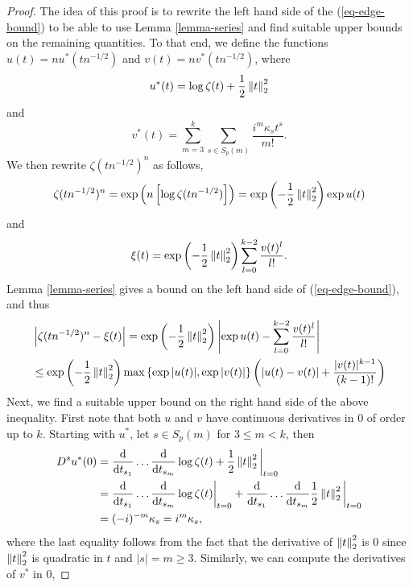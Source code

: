 \begin{proof}
    The idea of this proof is to rewrite the left hand side of the (\ref{eq-edge-bound}) to be able to use Lemma \ref{lemma-series} and find suitable upper bounds on the remaining quantities. To that end, we define the functions $u(t) = n u^*(t n^{-1/2})$ and $v(t) = nv^*(t n^{-1/2})$, where
    \begin{equation*}
        u^*(t) = \log \zeta(t) + \frac{1}{2}\left\lVert t\right\rVert_2^2
    \end{equation*}
    and 
    \begin{equation*}
        v^*(t) = \sum_{m=3}^k \sum_{s \in S_p(m)} \frac{i^m\kappa_s t^s}{m!}.
    \end{equation*}
    We then rewrite $\zeta(t n^{-1/2})^n$ as follows,
    \begin{equation*}
        \zeta(t n^{-1/2})^n = \exp\left(n\left[\log \zeta(t n^{-1/2})\right]\right) = \exp\left(-\frac{1}{2}\left\lVert t\right\rVert_2^2\right)\exp u(t)
    \end{equation*}
    and
    \begin{equation*}
        \xi(t) = \exp\left(-\frac{1}{2}\left\lVert t\right\rVert_2^2\right)\sum_{l=0}^{k-2} \frac{v(t)^l}{l!}.
    \end{equation*}
    Lemma \ref{lemma-series} gives a bound on the left hand side of (\ref{eq-edge-bound}), and thus
    \begin{align*}
        &\left|\zeta(t n^{-1/2})^n - \xi(t)\right| 
        = \exp\left(-\frac{1}{2}\left\lVert t\right\rVert_2^2\right)\left|\exp u(t) - \sum_{l=0}^{k-2} \frac{v(t)^l}{l!}\right|\\
        &\leq \exp\left(-\frac{1}{2}\left\lVert t\right\rVert_2^2\right) \max \left\{ \exp{|u(t)|}, \exp{|v(t)|} \right\}\left(\left|u(t) - v(t)\right| + \frac{|v(t)|^{k-1}}{(k-1)!}\right)
    \end{align*}
    Next, we find a suitable upper bound on the right hand side of the above inequality. First note that both $u$ and $v$ have continuous derivatives in 0 of order up to $k$. Starting with $u^*$, let $s \in S_p(m)$ for $3 \leq m < k$, then
    \begin{align*}
        D^s u^*(0)
        &= \frac{\text{d}}{\text{d} t_{s_1}}\ldots\frac{\text{d}}{\text{d} t_{s_m}} \log \zeta(t) + \frac{1}{2}\left\lVert t\right\rVert_2^2\bigg|_{t=0}\\
        &=  \frac{\text{d}}{\text{d} t_{s_1}}\ldots\frac{\text{d}}{\text{d} t_{s_m}} \log \zeta(t)\bigg|_{t=0}
            +
            \frac{\text{d}}{\text{d} t_{s_1}}\ldots\frac{\text{d}}{\text{d} t_{s_m}} \frac{1}{2}\left\lVert t\right\rVert_2^2\bigg|_{t=0}
        \\
        &= (-i)^{-m}\kappa_s = i^m \kappa_s ,
    \end{align*}
    where the last equality follows from the fact that the derivative of $\left\lVert t\right\rVert_2^2$ is 0 since $\left\lVert t\right\rVert_2^2$ is quadratic in $t$ and $|s| = m \geq 3$. Similarly, we can compute the derivatives of $v^*$ in 0,

\end{proof}
